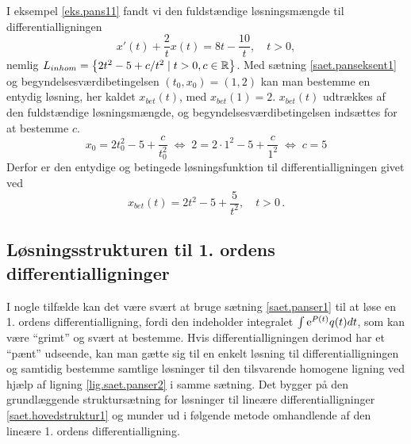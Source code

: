 \begin{example} \label{eks.pans21}
I eksempel \ref{eks.pans11} fandt vi den fuldstændige løsningsmængde til differentialligningen
\begin{equation} 
x'(t) + \frac{2}{t} x(t) = 8t - \frac{10}{t}, \quad t > 0,
\end{equation}
nemlig $ L_{inhom} = \left\lbrace 2t^2 - 5 + c/t^2 \mid t > 0, c \in \mathbb{R} \right\rbrace $. \bs
Med sætning \ref{saet.panseksent1} og begyndelsesværdibetingelsen $ (t_0,x_0) = (1,2) $ kan man bestemme en entydig løsning, her kaldet $ x_{bet}(t) $, med $ x_{bet}(1) = 2 $. $ x_{bet}(t) $ udtrækkes af den fuldstændige løsningsmængde, og begyndelsesværdibetingelsen indsættes for at bestemme $ c $.
\begin{equation} 
x_0 = 2t_0^2 - 5 + \frac{c}{t_0^2} \; \Leftrightarrow \; 2 = 2 \cdot 1^2 - 5 + \frac{c}{1^2} \; \Leftrightarrow \; c = 5 
\end{equation}
Derfor er den entydige og betingede løsningsfunktion til differentialligningen givet ved
\begin{equation} 
x_{bet}(t) = 2t^2 - 5 + \frac{5}{t^2}, \quad t > 0\,.
\end{equation}
\end{example}

\subsection{Løsningsstrukturen til 1. ordens differentialligninger} \label{subsek.struktur1}

I nogle tilfælde kan det være svært at bruge sætning \ref{saet.panser1} til at løse en 1. ordens differentialligning, fordi den indeholder integralet $ \int \mathrm{e}^{P(t)}q(t) dt $, som kan være ``grimt'' og svært at bestemme. Hvis differentialligningen derimod har et ``pænt'' udseende, kan man gætte sig til en enkelt løsning til differentialligningen og samtidig bestemme samtlige løsninger til den tilsvarende homogene ligning ved hjælp af ligning \eqref{lig.saet.panser2} i samme sætning. Det bygger på den grundlæggende struktursætning for løsninger til lineære differentialligninger \ref{saet.hovedstruktur1} og munder ud i følgende metode omhandlende  af den lineære 1. ordens differentialligning.

